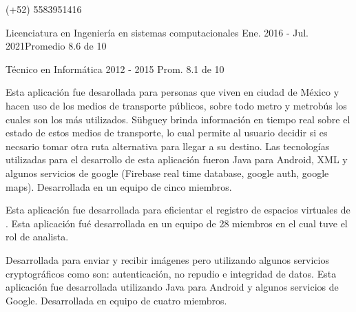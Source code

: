 \documentclass{resume}
\begin{document}
{}
{}
{(+52) 5583951416}

{Licenciatura en Ingeniería en sistemas computacionales}
{Ene. 2016 - Jul. 2021}{Promedio 8.6 de 10}\break

{Técnico en Informática}
{2012 - 2015}
{Prom. 8.1 de 10}

{Esta aplicación fue desarollada para personas que viven en ciudad de México y hacen uso de los medios de transporte públicos, sobre todo metro y metrobús los cuales son los más utilizados. Sübguey brinda información en tiempo real sobre el estado de estos medios de transporte, lo cual permite al usuario decidir si es necsario tomar otra ruta alternativa para llegar a su destino. Las tecnologías utilizadas para el desarrollo de esta aplicación fueron Java para Android, XML y algunos servicios de google (Firebase real time database, google auth, google maps). Desarrollada en un equipo de cinco miembros. }

{Esta aplicación fue desarrollada para eficientar el registro de espacios virtuales de . Esta aplicación fué desarrollada en un equipo de 28 miembros en el cual tuve el rol de analista.}

{Desarrollada para enviar y recibir imágenes pero utilizando algunos servicios cryptográficos como son: autenticación, no repudio e integridad de datos. Esta aplicación fue desarrollada utilizando Java para Android y algunos servicios de Google. Desarrollada en equipo de cuatro miembros. }
\end{document}
